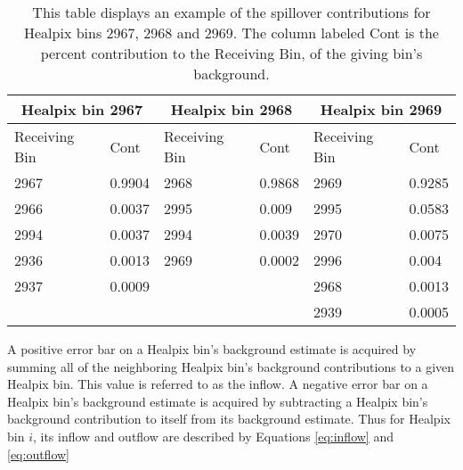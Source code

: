 \begin{table}[]
\centering
\begin{tabular}{||l|l||l|l||l|l||}
\hline
\hline
\multicolumn{2}{||c||}{Healpix bin 2967}              & \multicolumn{2}{c||}{Healpix bin 2968}               & \multicolumn{2}{c||}{Healpix bin 2969} \\ \hline
Receiving Bin            & Cont            & Receiving Bin            & Cont            & Receiving Bin     & Cont     \\ \hline  \hline
2967                     & 0.9904                   & 2968                     & 0.9868                   & 2969              & 0.9285            \\ \hline
2966                     & 0.0037                   & 2995                     & 0.009                    & 2995              & 0.0583            \\ \hline
2994                     & 0.0037                   & 2994                     & 0.0039                   & 2970              & 0.0075            \\ \hline
2936                     & 0.0013                   & 2969                     & 0.0002                   & 2996              & 0.004             \\ \hline
2937                     & 0.0009                   & \cellcolor[HTML]{C0C0C0} & \cellcolor[HTML]{C0C0C0} & 2968              & 0.0013            \\ \hline
\cellcolor[HTML]{C0C0C0} & \cellcolor[HTML]{C0C0C0} & \cellcolor[HTML]{C0C0C0} & \cellcolor[HTML]{C0C0C0} & 2939              & 0.0005            \\ \hline \hline
\end{tabular}
\caption[Spillover Example Table]{This table displays an example of the spillover contributions for Healpix bins 2967, 2968 and 2969. The column labeled Cont is the percent contribution to the Receiving Bin, of the giving bin's background.}
\label{tab:spillTable}
\end{table}

A positive error bar on a Healpix bin's background estimate is acquired by summing all of the neighboring Healpix bin's background contributions to a given Healpix bin.  This value is referred to as the inflow.  A negative error bar on a Healpix bin's background estimate is acquired by subtracting a Healpix bin's background contribution to itself from its background estimate.  Thus for Healpix bin $i$, its inflow and outflow are described by Equations \ref{eq:inflow} and \ref{eq:outflow}

